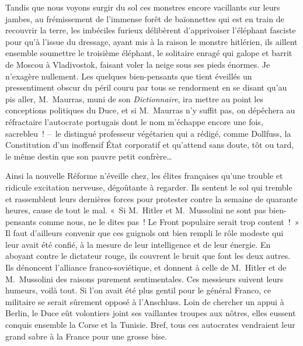 \documentclass[french,twoside]{book} %
\newcommand{\astertri}{\medskip\par\centerline{\color{rubric}\large\selectfont{\syms ✻\,✻\,✻}}\medskip\par}%
\begin{document}
Tandis que nous voyons surgir du sol ces monstres encore vacillants sur leurs jambes, au frémissement de l’immense forêt de baïonnettes qui est en train de recouvrir la terre, les imbéciles furieux délibèrent d’apprivoiser l’éléphant fasciste pour qu’à l’issue du dressage, ayant mis à la raison le monstre hitlérien, ils aillent ensemble soumettre le troisième éléphant, le solitaire enragé qui galope et barrit de Moscou à Vladivostok, faisant voler la neige sous ses pieds énormes. Je n’exagère nullement. Les quelques bien-pensants que tient éveillés un pressentiment obscur du péril couru par tous se rendorment en se disant qu’au pis aller, M. Maurras, muni de son \emph{Dictionnaire}, ira mettre au point les conceptions politiques du Duce, et si M. Maurras n’y suffit pas, on dépêchera au réfractaire l’autocrate portugais dont le nom m’échappe encore une fois, sacrebleu ! – le distingué professeur végétarien qui a rédigé, comme Dollfuss, la Constitution d’un inoffensif État corporatif et qu’attend sans doute, tôt ou tard, le même destin que son pauvre petit confrère…\par
Ainsi la nouvelle Réforme n’éveille chez, les élites françaises qu’une trouble et ridicule excitation nerveuse, dégoûtante à regarder. Ils sentent le sol qui tremble et rassemblent leurs dernières forces pour protester contre la semaine de quarante heures, cause de tout le mal. « Si M. Hitler et M. Mussolini ne sont pas bien-pensants comme nous, ne le dites pas ! Le Front populaire serait trop content ! » Il faut d’ailleurs convenir que ces guignols ont bien rempli le rôle modeste qui leur avait été confié, à la mesure de leur intelligence et de leur énergie. En aboyant contre le dictateur rouge, ils couvrent le bruit que font les deux autres. Ils dénoncent l’alliance franco-soviétique, et donnent à celle de M. Hitler et de M. Mussolini des raisons purement sentimentales. Ces messieurs suivent leurs humeurs, voilà tout. Si l’on avait été plus gentil pour le général Franco, ce militaire se serait sûrement opposé à l’Anschluss. Loin de chercher un appui à Berlin, le Duce eût volontiers joint ses vaillantes troupes aux nôtres, elles eussent conquis ensemble la Corse et la Tunisie. Bref, tous ces autocrates vendraient leur grand sabre à la France pour une grosse bise.\par
 \par

\astertri
\end{document}
